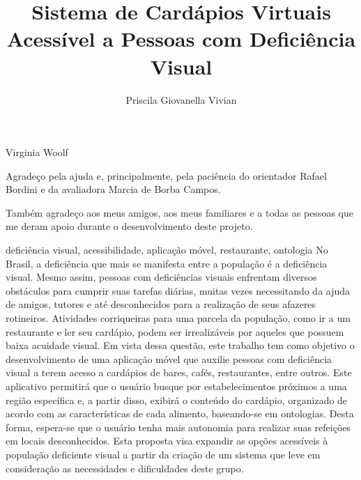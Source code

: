 \documentclass[portuguese,oneside]{tcc}
\author{Priscila Giovanella Vivian}
\title{Sistema de Cardápios Virtuais Acessível a Pessoas com Deficiência Visual}
      {A Virtual Menu System Accessible to Visually Impaired People}
\begin{document}

         {Virginia Woolf}


\begin{agradecimentos}
Agradeço pela ajuda e, principalmente, pela paciência do orientador Rafael Bordini e da avaliadora Marcia de Borba Campos.

Também agradeço aos meus amigos, aos meus familiares e a todas as pessoas que me deram apoio durante o desenvolvimento deste projeto.
\end{agradecimentos}

\begin{resumo}{deficiência visual, acessibilidade, aplicação móvel, restaurante, ontologia}
No Brasil, a deficiência que mais se manifesta entre a população é a deficiência visual. Mesmo assim, pessoas com deficiências visuais enfrentam diversos obstáculos para cumprir suas tarefas diárias, muitas vezes necessitando da ajuda de amigos, tutores e até desconhecidos para a realização de seus afazeres rotineiros. Atividades corriqueiras para uma parcela da população, como ir a um restaurante e ler seu cardápio, podem ser irrealizáveis por aqueles que possuem baixa acuidade visual. Em vista dessa questão, este trabalho tem como objetivo o desenvolvimento de uma aplicação móvel que auxilie pessoas com deficiência visual a terem acesso a cardápios de bares, cafés, restaurantes, entre outros. Este aplicativo permitirá que o usuário busque por estabelecimentos próximos a uma região específica e, a partir disso, exibirá o conteúdo do cardápio, organizado de acordo com as características de cada alimento, baseando-se em ontologias. Desta forma, espera-se que o usuário tenha mais autonomia para realizar suas refeições em locais desconhecidos. Esta proposta visa expandir as opções acessíveis à população deficiente visual a partir da criação de um sistema que leve em consideração as necessidades e dificuldades deste grupo.
\end{resumo}
\end{document}
